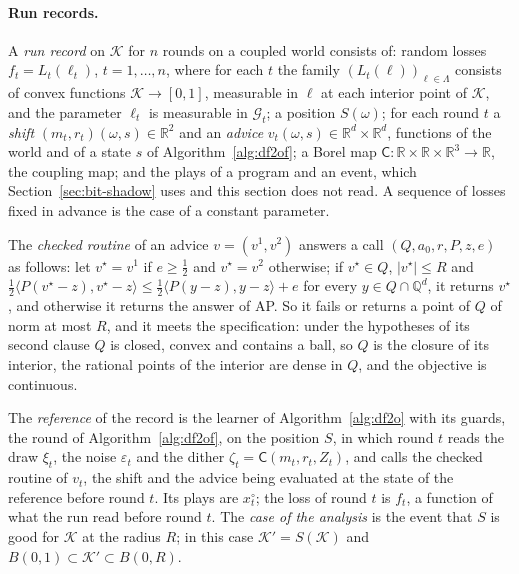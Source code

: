 \documentclass[11pt]{amsart}
\theoremstyle{definition}
\numberwithin{equation}{section}
\newcommand{\R}{\mathbb{R}}
\newcommand{\cK}{\mathcal{K}}
\newcommand{\cG}{\mathscr{G}}
\newcommand{\ip}[1]{\langle #1\rangle}
\begin{document}
\paragraph{Run records.} A \emph{run record} on $\cK$ for $n$ rounds on a coupled world consists of: random losses $f_t=L_t(\ell_t)$, $t=1,\dots,n$, where for each $t$ the family $(L_t(\ell))_{\ell\in\Lambda}$ consists of convex functions $\cK\to[0,1]$, measurable in $\ell$ at each interior point of $\cK$, and the parameter $\ell_t$ is measurable in $\cG_t$; a position $S(\omega)$; for each round $t$ a \emph{shift} $(m_t,r_t)(\omega,s)\in\R^2$ and an \emph{advice} $v_t(\omega,s)\in\R^d\times\R^d$, functions of the world and of a state $s$ of Algorithm~\ref{alg:df2of}; a Borel map $\mathsf C:\R\times\R\times\R^3\to\R$, the coupling map; and the plays of a program and an event, which Section~\ref{sec:bit-shadow} uses and this section does not read. A sequence of losses fixed in advance is the case of a constant parameter.

The \emph{checked routine} of an advice $v=(v^1,v^2)$ answers a call $(Q,a_0,r,P,z,e)$ as follows: let $v^\star=v^1$ if $e\ge\frac12$ and $v^\star=v^2$ otherwise; if $v^\star\in Q$, $|v^\star|\le R$ and $\frac12\ip{P(v^\star-z),v^\star-z}\le\frac12\ip{P(y-z),y-z}+e$ for every $y\in Q\cap\mathbb Q^d$, it returns $v^\star$, and otherwise it returns the answer of AP. So it fails or returns a point of $Q$ of norm at most $R$, and it meets the specification: under the hypotheses of its second clause $Q$ is closed, convex and contains a ball, so $Q$ is the closure of its interior, the rational points of the interior are dense in $Q$, and the objective is continuous.

The \emph{reference} of the record is the learner of Algorithm~\ref{alg:df2o} with its guards, the round of Algorithm~\ref{alg:df2of}, on the position $S$, in which round $t$ reads the draw $\xi_t$, the noise $\varepsilon_t$ and the dither $\zeta_t=\mathsf C(m_t,r_t,Z_t)$, and calls the checked routine of $v_t$, the shift and the advice being evaluated at the state of the reference before round $t$. Its plays are $x^\circ_t$; the loss of round $t$ is $f_t$, a function of what the run read before round $t$. The \emph{case of the analysis} is the event that $S$ is good for $\cK$ at the radius $R$; in this case $\cK'=S(\cK)$ and $B(0,1)\subset\cK'\subset B(0,R)$.
\end{document}
